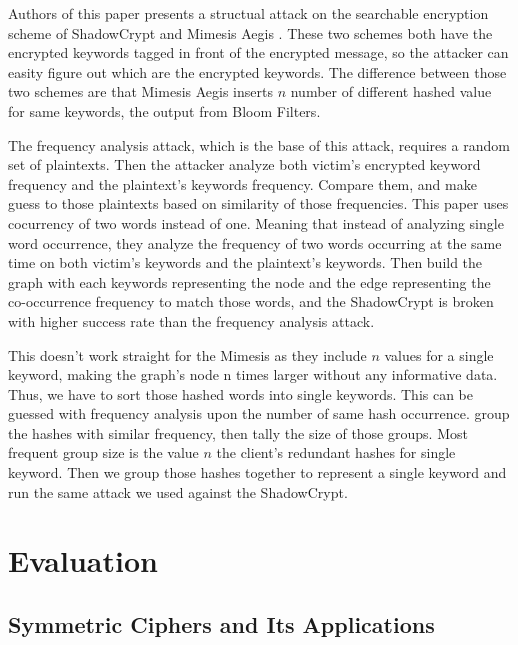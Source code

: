 \documentclass[a4paper]{article}
\begin{document}
Authors of this paper \cite{pouliot2016shadow} presents a structual attack on the searchable encryption scheme of ShadowCrypt \cite{he2014shadowcrypt} and Mimesis Aegis \cite{184441}. These two schemes both have the encrypted keywords tagged in front of the encrypted message, so the attacker can easity figure out which are the encrypted keywords. The difference between those two schemes are that Mimesis Aegis inserts $n$ number of different hashed value for same keywords, the output from Bloom Filters. 
\par The frequency analysis attack, which is the base of this attack, requires a random set of plaintexts. Then the attacker analyze both victim's encrypted keyword frequency and the plaintext's keywords frequency. Compare them, and make guess to those plaintexts based on similarity of those frequencies. This paper uses cocurrency of two words instead of one. Meaning that instead of analyzing single word occurrence, they analyze the frequency of two words occurring at the same time on both victim's keywords and the plaintext's keywords. Then build the graph with each keywords representing the node and the edge representing the co-occurrence frequency to match those words, and the ShadowCrypt is broken with higher success rate than the frequency analysis attack.
\par This doesn't work straight for the Mimesis as they include $n$ values for a single keyword, making the graph's node n times larger without any informative data. Thus, we have to sort those hashed words into single keywords. This can be guessed with frequency analysis upon the number of same hash occurrence. group the hashes with similar frequency, then tally the size of those groups. Most frequent group size is the value $n$ the client's redundant hashes for single keyword. Then we group those hashes together to represent a single keyword and run the same attack we used against the ShadowCrypt.

\section{Evaluation}

\subsection{Symmetric Ciphers and Its Applications}
\end{document}
